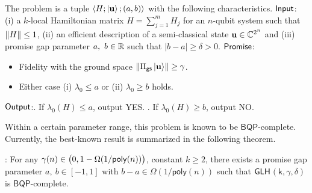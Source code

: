 \documentclass[11pt]{article}
\begin{document}
\begin{prob}
 The problem is a tuple $\langle H; \ket{\mathbf{u}};(a,b) \rangle$ with the following characteristics. \newline
$\mathsf{Input}$: (i) a $k$-local Hamiltonian matrix  $H=\sum_{j=1}^{m}H_j$ for an $n$-qubit system such that $\norm{H}\leq 1$, (ii) an efficient description of a semi-classical state $\mathbf{u}\in \mathbb{C}^{2^n}$ and (iii) promise gap parameter $a,\ b\in \mathbb{R}$ such that $|b-a|\geq \delta>0$. \newline
$\mathsf{Promise}$:
\begin{itemize}
    \item Fidelity with the ground space $\norm{\Pi_{\mathsf{gs}} \ket{\mathbf{u}}}\geq \gamma$.
    \item Either case (i) $\lambda_0\leq a$ or (ii) $\lambda_0\geq b$ holds.
\end{itemize}
$\mathsf{Output}$:. If $\lambda_0(H) \leq a$, output YES. . If $\lambda_0(H) \geq b$, output NO.
\end{prob}
Within a certain parameter range, this problem is known to be $\mathsf{BQP}$-complete. Currently, the best-known result is summarized in the following theorem.
\begin{theorem}
    : For any $\gamma(n)\in \big(0, 1-\Omega(1/\mathsf{poly}(n))\big)$, constant $k\geq 2$, there exists a promise gap parameter $a,\ b \in [-1,1]$ with $b-a\in \Omega(1/\mathsf{poly}(n))$ such that $\mathsf{GLH}$$\mathsf{(k,\gamma,\delta)}$ is $\mathsf{BQP}$-complete.
\end{theorem}
\end{document}
